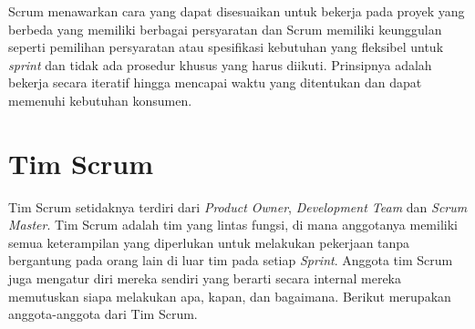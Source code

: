 Scrum menawarkan cara yang dapat disesuaikan untuk bekerja pada proyek yang berbeda yang memiliki berbagai persyaratan dan Scrum memiliki keunggulan seperti pemilihan persyaratan atau spesifikasi kebutuhan yang fleksibel untuk \textit{sprint} dan tidak ada prosedur khusus yang harus diikuti. Prinsipnya adalah bekerja secara iteratif hingga mencapai waktu yang ditentukan dan dapat memenuhi kebutuhan konsumen.

\section{Tim Scrum}
Tim Scrum setidaknya terdiri dari \textit{Product Owner}, \textit{Development Team} dan \textit{Scrum Master}. Tim Scrum adalah tim yang lintas fungsi, di mana anggotanya memiliki semua keterampilan yang diperlukan untuk melakukan pekerjaan tanpa bergantung pada orang lain di luar tim pada setiap \textit{Sprint}. Anggota tim Scrum juga mengatur diri mereka sendiri yang berarti secara internal mereka memutuskan siapa melakukan apa, kapan, dan bagaimana. Berikut merupakan anggota-anggota dari Tim Scrum.

